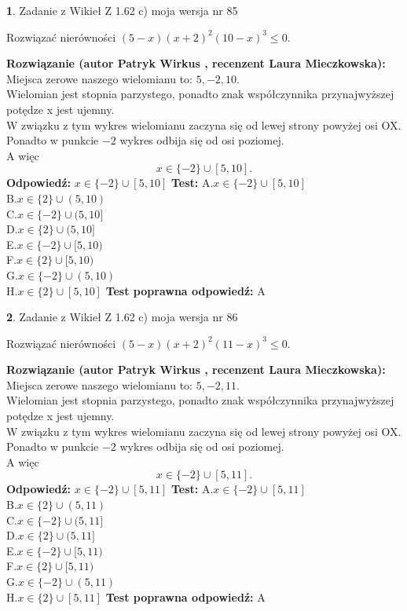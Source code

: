 \documentclass[12pt, a4paper]{article}
\theoremstyle{definition} %
\newtheorem{zad}{}
\newcommand{\zadStart}[1]{\begin{zad}#1\newline}
\newcommand{\zadStop}{\end{zad}}
\newcommand{\rozwStart}[2]{\noindent \textbf{Rozwiązanie (autor #1 , recenzent #2): }\newline}
\newcommand{\rozwStop}{\newline}
\newcommand{\odpStart}{\noindent \textbf{Odpowiedź:}\newline}
\newcommand{\odpStop}{\newline}
\newcommand{\testStart}{\noindent \textbf{Test:}\newline}
\newcommand{\testStop}{\newline}
\newcommand{\kluczStart}{\noindent \textbf{Test poprawna odpowiedź:}\newline}
\newcommand{\kluczStop}{\newline}
\begin{document}
\zadStart{Zadanie z Wikieł Z 1.62 c) moja wersja nr 85}

Rozwiązać nierówności $(5-x)(x+2)^{2}(10-x)^{3}\le0$.
\zadStop
\rozwStart{Patryk Wirkus}{Laura Mieczkowska}
Miejsca zerowe naszego wielomianu to: $5, -2, 10$.\\
Wielomian jest stopnia parzystego, ponadto znak współczynnika przy\linebreak najwyższej potędze x jest ujemny.\\ W związku z tym wykres wielomianu zaczyna się od lewej strony powyżej osi OX.\\
Ponadto w punkcie $-2$ wykres odbija się od osi poziomej.\\
A więc $$x \in \{-2\} \cup [5,10].$$
\rozwStop
\odpStart
$x \in \{-2\} \cup [5,10]$
\odpStop
\testStart
A.$x \in \{-2\} \cup [5,10]$\\
B.$x \in \{2\} \cup (5,10)$\\
C.$x \in \{-2\} \cup (5,10]$\\
D.$x \in \{2\} \cup (5,10]$\\
E.$x \in \{-2\} \cup [5,10)$\\
F.$x \in \{2\} \cup [5,10)$\\
G.$x \in \{-2\} \cup (5,10)$\\
H.$x \in \{2\} \cup [5,10]$
\testStop
\kluczStart
A
\kluczStop



\zadStart{Zadanie z Wikieł Z 1.62 c) moja wersja nr 86}

Rozwiązać nierówności $(5-x)(x+2)^{2}(11-x)^{3}\le0$.
\zadStop
\rozwStart{Patryk Wirkus}{Laura Mieczkowska}
Miejsca zerowe naszego wielomianu to: $5, -2, 11$.\\
Wielomian jest stopnia parzystego, ponadto znak współczynnika przy\linebreak najwyższej potędze x jest ujemny.\\ W związku z tym wykres wielomianu zaczyna się od lewej strony powyżej osi OX.\\
Ponadto w punkcie $-2$ wykres odbija się od osi poziomej.\\
A więc $$x \in \{-2\} \cup [5,11].$$
\rozwStop
\odpStart
$x \in \{-2\} \cup [5,11]$
\odpStop
\testStart
A.$x \in \{-2\} \cup [5,11]$\\
B.$x \in \{2\} \cup (5,11)$\\
C.$x \in \{-2\} \cup (5,11]$\\
D.$x \in \{2\} \cup (5,11]$\\
E.$x \in \{-2\} \cup [5,11)$\\
F.$x \in \{2\} \cup [5,11)$\\
G.$x \in \{-2\} \cup (5,11)$\\
H.$x \in \{2\} \cup [5,11]$
\testStop
\kluczStart
A
\kluczStop
\end{document}

